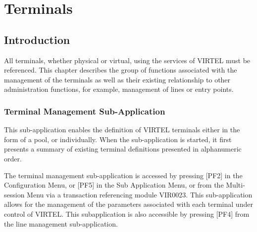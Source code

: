 \documentclass[letterpaper,10pt,english]{sphinxmanual}
\begin{document}
\ignorespaces 

\chapter{Terminals}
\label{\detokenize{connectivity_guide:terminals}}\label{\detokenize{connectivity_guide:index-94}}

\section{Introduction}
\label{\detokenize{connectivity_guide:id48}}
All terminals, whether physical or virtual, using the services of VIRTEL must be referenced. This chapter describes the group of functions associated with the management of the terminals as well as their existing relationship to other administration functions, for example, management of lines or entry points.

\ignorespaces 

\subsection{Terminal Management Sub-Application}
\label{\detokenize{connectivity_guide:terminal-management-sub-application}}\label{\detokenize{connectivity_guide:index-95}}
This sub-application enables the definition of VIRTEL terminals either in the form of a pool, or individually. When the sub-application is started, it first presents a summary of existing terminal definitions presented in alphanumeric order.

The terminal management sub-application is accessed by pressing {[}PF2{]} in the Configuration Menu, or {[}PF5{]} in the Sub Application Menu, or from the Multi-session Menu via a transaction referencing module VIR0023. This sub-application allows for the management of the parameters associated with each terminal under control of VIRTEL. This subapplication
is also accessible by pressing {[}PF4{]} from the line management sub-application.

\ignorespaces 
\end{document}

